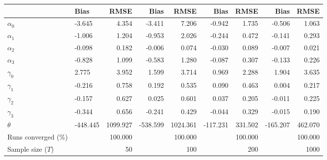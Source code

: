 
\begin{tabular}[t]{llrrrrrrr}
\toprule
  & Bias & RMSE & Bias & RMSE & Bias & RMSE & Bias & RMSE\\
\midrule
$\alpha_{0}$ & -3.645 & 4.354 & -3.411 & 7.206 & -0.942 & 1.735 & -0.506 & 1.063\\
$\alpha_{1}$ & -1.006 & 1.204 & -0.953 & 2.026 & -0.244 & 0.472 & -0.141 & 0.293\\
$\alpha_{2}$ & -0.098 & 0.182 & -0.006 & 0.074 & -0.030 & 0.089 & -0.007 & 0.021\\
$\alpha_{3}$ & -0.828 & 1.099 & -0.583 & 1.280 & -0.087 & 0.307 & -0.133 & 0.226\\
$\gamma_{0}$ & 2.775 & 3.952 & 1.599 & 3.714 & 0.969 & 2.288 & 1.904 & 3.635\\
$\gamma_{1}$ & -0.216 & 0.758 & 0.192 & 0.535 & 0.090 & 0.463 & 0.004 & 0.217\\
$\gamma_{2}$ & -0.157 & 0.627 & 0.025 & 0.601 & 0.037 & 0.205 & -0.011 & 0.225\\
$\gamma_{3}$ & -0.344 & 0.656 & -0.241 & 0.429 & -0.044 & 0.329 & -0.015 & 0.190\\
$\theta$ & -448.445 & 1099.927 & -538.599 & 1024.361 & -117.231 & 331.502 & -165.207 & 462.070\\
Runs converged (\%) &  & 100.000 &  & 100.000 &  & 100.000 &  & 100.000\\
Sample size ($T$) &  & 50 &  & 100 &  & 200 &  & 1000\\
\bottomrule
\end{tabular}
